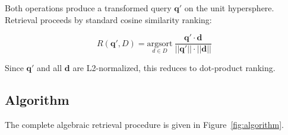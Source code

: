 \documentclass{article}
\begin{document}
Both operations produce a transformed query $\mathbf{q}'$ on the unit hypersphere. Retrieval proceeds by standard cosine similarity ranking:

\begin{equation}
R(\mathbf{q}', D) = \underset{d \in D}{\text{argsort}} \ \frac{\mathbf{q}' \cdot \mathbf{d}}{||\mathbf{q}'|| \cdot ||\mathbf{d}||}
\end{equation}

Since $\mathbf{q}'$ and all $\mathbf{d}$ are L2-normalized, this reduces to dot-product ranking.

\subsection{Algorithm}

The complete algebraic retrieval procedure is given in Figure~\ref{fig:algorithm}.
\end{document}
